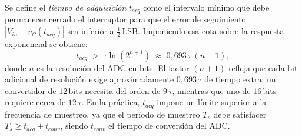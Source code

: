 Se define el \emph{tiempo de adquisición} $t_{acq}$ como el intervalo mínimo
que debe permanecer cerrado el interruptor para que el error de seguimiento
$|V_{in} - v_C(t_{acq})|$ sea inferior a $\tfrac{1}{2}$\,LSB.
Imponiendo esa cota sobre la respuesta exponencial se obtiene:
%
\begin{equation}\label{eq:tacq}
  t_{acq} \;>\; \tau\ln\!\left(2^{n+1}\right) \;\approx\; 0{,}693\,\tau\,(n+1),
\end{equation}
%
donde $n$ es la resolución del ADC en bits.
El factor $(n+1)$ refleja que cada bit adicional de resolución exige
aproximadamente $0{,}693\,\tau$ de tiempo extra: un convertidor de
$12$\,bits necesita del orden de $9\,\tau$, mientras que uno de $16$\,bits
requiere cerca de $12\,\tau$.
En la práctica, $t_{acq}$ impone un límite superior a la frecuencia de
muestreo, ya que el período de muestreo $T_s$ debe satisfacer
$T_s \geq t_{acq} + t_{conv}$, siendo $t_{conv}$ el tiempo de conversión
del ADC.


 
 
 
 
 
